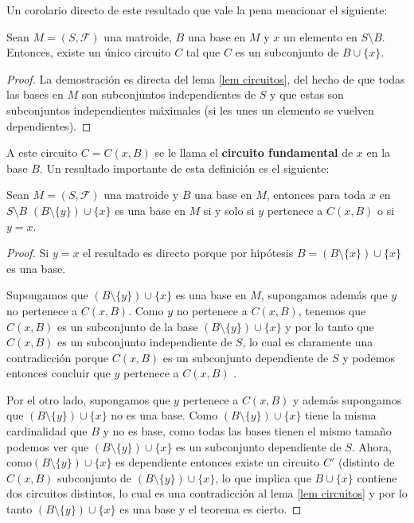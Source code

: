 Un corolario directo de este resultado que vale la pena mencionar el siguiente:

\begin{cor} \label{circuitos bases}
Sean $M=(S,\mathcal{F})$ una matroide, $B$ una base en $M$ y $x$ un elemento en $S \setminus B$. Entonces, existe un único circuito $C$ tal que $C$ es un subconjunto de $B \cup \{x\}$. 
\end{cor}

\begin{proof}
La demostración es directa del lema \ref{lem circuitos}, del hecho de que todas las bases en $M$ son subconjuntos independientes de $S$ y que estas son subconjuntos independientes máximales (si les unes un elemento se vuelven dependientes). 
\end{proof}

A este circuito $C=C(x,B)$ se le llama el \textbf{circuito fundamental} de $x$ en la base $B$. Un resultado importante de esta definición es el siguiente:

\begin{teo}
Sean $M=(S,\mathcal{F})$ una matroide y $B$ una base en $M$, entonces para toda $x$ en $S \setminus B$ $(B \setminus \{ y\}) \cup \{x\}$ es una base en $M$ si y solo si $y$ pertenece a $C(x,B)$ o si $y=x$.
\end{teo}

\begin{proof}
Si $y=x$ el resultado es directo porque por hipótesis $B=$$(B \setminus \{ x\}) \cup \{x\}$ es una base. 
 
Supongamos que $(B \setminus \{ y\}) \cup \{x\}$ es una base en $M$, supongamos además que $y$ no pertenece a $C(x,B)$. Como $y$ no pertenece a $C(x,B)$, tenemos que $C(x,B)$ es un subconjunto de la base $(B \setminus \{ y\}) \cup \{x\}$ y por lo tanto que $C(x,B)$ es un subconjunto independiente de $S$, lo cual es claramente una contradicción porque $C(x,B)$ es un subconjunto dependiente de $S$ y podemos entonces concluir que $y$ pertenece a $C(x,B)$ . 

Por el otro lado, supongamos que $y$ pertenece a $C(x,B)$ y además supongamos que $(B \setminus \{ y\}) \cup \{x\}$ no es una base. Como $(B \setminus \{ y\}) \cup \{x\}$ tiene la misma cardinalidad que $B$ y no es base, como todas las bases tienen el mismo tamaño podemos ver que $(B \setminus \{ y\}) \cup \{x\}$ es un subconjunto dependiente de $S$. Ahora, como$(B \setminus \{ y\}) \cup \{x\}$ es dependiente entonces existe un circuito $C'$ (distinto de $C(x,B)$ subconjunto de $(B \setminus \{ y\}) \cup \{x\}$, lo que implica que $B \cup \{x\}$ contiene dos circuitos distintos, lo cual es una contradicción al lema \ref{lem circuitos} y por lo tanto $(B \setminus \{ y\}) \cup \{x\}$ es una base y el teorema es cierto. 
\end{proof}

